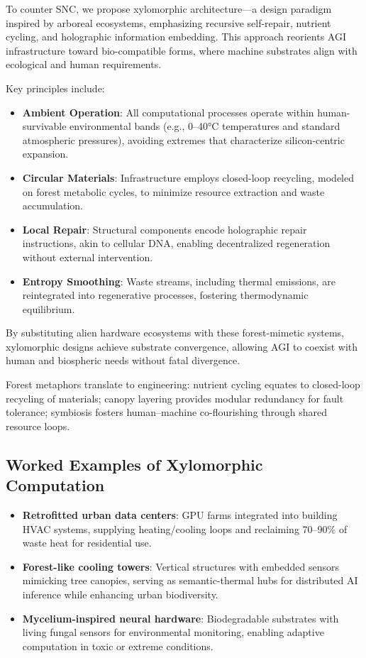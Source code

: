 \documentclass[12pt]{article}
\begin{document}
To counter SNC, we propose xylomorphic architecture—a design paradigm inspired by arboreal ecosystems, emphasizing recursive self-repair, nutrient cycling, and holographic information embedding. This approach reorients AGI infrastructure toward bio-compatible forms, where machine substrates align with ecological and human requirements.

Key principles include:

\begin{itemize}
\item \textbf{Ambient Operation}: All computational processes operate within human-survivable environmental bands (e.g., 0–40°C temperatures and standard atmospheric pressures), avoiding extremes that characterize silicon-centric expansion.
\item \textbf{Circular Materials}: Infrastructure employs closed-loop recycling, modeled on forest metabolic cycles, to minimize resource extraction and waste accumulation.
\item \textbf{Local Repair}: Structural components encode holographic repair instructions, akin to cellular DNA, enabling decentralized regeneration without external intervention.
\item \textbf{Entropy Smoothing}: Waste streams, including thermal emissions, are reintegrated into regenerative processes, fostering thermodynamic equilibrium.
\end{itemize}

By substituting alien hardware ecosystems with these forest-mimetic systems, xylomorphic designs achieve substrate convergence, allowing AGI to coexist with human and biospheric needs without fatal divergence.

Forest metaphors translate to engineering: nutrient cycling equates to closed-loop recycling of materials; canopy layering provides modular redundancy for fault tolerance; symbiosis fosters human–machine co-flourishing through shared resource loops.

\subsection{Worked Examples of Xylomorphic Computation}

\begin{itemize}
    \item \textbf{Retrofitted urban data centers}: GPU farms integrated into building HVAC systems, supplying heating/cooling loops and reclaiming 70--90\% of waste heat for residential use.
    \item \textbf{Forest-like cooling towers}: Vertical structures with embedded sensors mimicking tree canopies, serving as semantic-thermal hubs for distributed AI inference while enhancing urban biodiversity.
    \item \textbf{Mycelium-inspired neural hardware}: Biodegradable substrates with living fungal sensors for environmental monitoring, enabling adaptive computation in toxic or extreme conditions.
\end{itemize}
\end{document}
